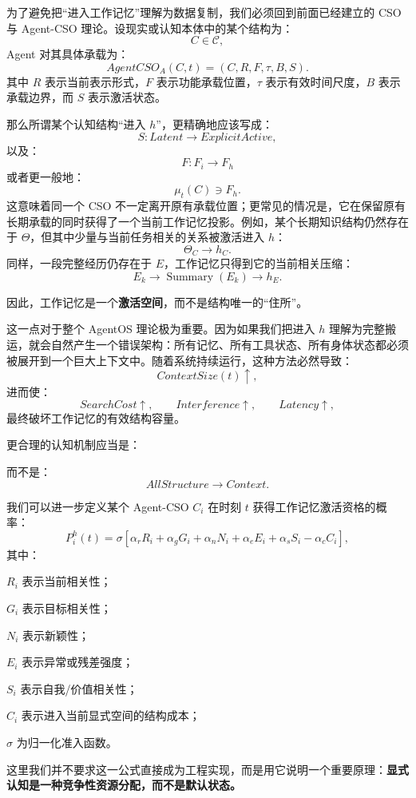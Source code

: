为了避免把“进入工作记忆”理解为数据复制，我们必须回到前面已经建立的 CSO 与 Agent-CSO 理论。设现实或认知本体中的某个结构为：
\[
C\in\mathcal C,
\]
Agent 对其具体承载为：
\[
AgentCSO_A(C,t)
=
(C,R,F,\tau,B,S).
\]
其中 $R$ 表示当前表示形式，$F$ 表示功能承载位置，$\tau$ 表示有效时间尺度，$B$ 表示承载边界，而 $S$ 表示激活状态。

那么所谓某个认知结构“进入 $h$”，更精确地应该写成：
\[
S:
Latent
\rightarrow
ExplicitActive,
\]
以及：
\[
F:
F_i
\rightarrow
F_h
\]
或者更一般地：
\[
\mu_t(C)
\ni
F_h.
\]
这意味着同一个 CSO 不一定离开原有承载位置；更常见的情况是，它在保留原有长期承载的同时获得了一个当前工作记忆投影。例如，某个长期知识结构仍然存在于 $\Theta$，但其中少量与当前任务相关的关系被激活进入 $h$：
\[
\Theta_C
\rightarrow
h_C.
\]
同样，一段完整经历仍存在于 $E$，工作记忆只得到它的当前相关压缩：
\[
E_k
\rightarrow
\operatorname{Summary}(E_k)
\rightarrow
h_E.
\]

因此，工作记忆是一个\textbf{激活空间}，而不是结构唯一的“住所”。

这一点对于整个 AgentOS 理论极为重要。因为如果我们把进入 $h$ 理解为完整搬运，就会自然产生一个错误架构：所有记忆、所有工具状态、所有身体状态都必须被展开到一个巨大上下文中。随着系统持续运行，这种方法必然导致：
\[
ContextSize(t)\uparrow,
\]
进而使：
\[
SearchCost\uparrow,
\qquad
Interference\uparrow,
\qquad
Latency\uparrow,
\]
最终破坏工作记忆的有效结构容量。

更合理的认知机制应当是：
\begin{statementbox}
\centering
{}
\end{statementbox}
而不是：
\[
AllStructure\rightarrow Context.
\]

我们可以进一步定义某个 Agent-CSO $C_i$ 在时刻 $t$ 获得工作记忆激活资格的概率：
\[
P_i^{h}(t)
=
\sigma
\left[
\alpha_rR_i
+
\alpha_gG_i
+
\alpha_nN_i
+
\alpha_eE_i
+
\alpha_sS_i
-
\alpha_cC_i
\right],
\]
其中：

$R_i$ 表示当前相关性；

$G_i$ 表示目标相关性；

$N_i$ 表示新颖性；

$E_i$ 表示异常或残差强度；

$S_i$ 表示自我/价值相关性；

$C_i$ 表示进入当前显式空间的结构成本；

$\sigma$ 为归一化准入函数。

这里我们并不要求这一公式直接成为工程实现，而是用它说明一个重要原理：\textbf{显式认知是一种竞争性资源分配，而不是默认状态。}

